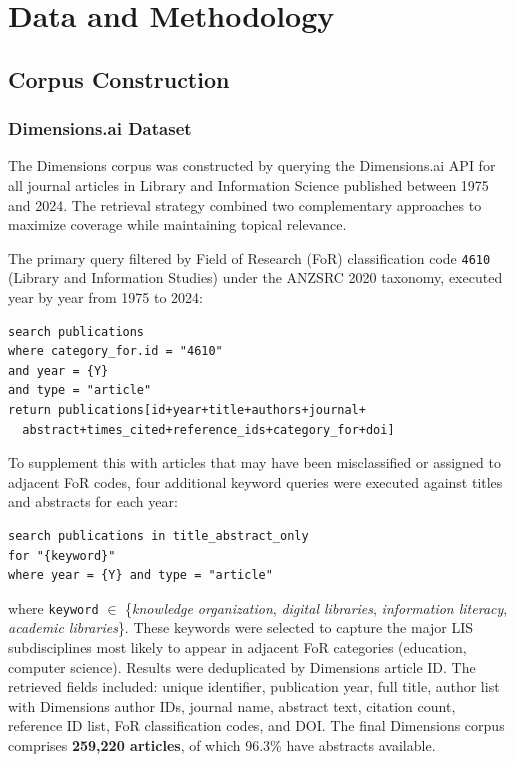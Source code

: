 \documentclass[12pt,a4paper]{article}
\begin{document}
\section{Data and Methodology}
\label{sec:data}

\subsection{Corpus Construction}

\subsubsection{Dimensions.ai Dataset}

The Dimensions corpus was constructed by querying the Dimensions.ai API for all
journal articles in Library and Information Science published between 1975 and
2024. The retrieval strategy combined two complementary approaches to maximize
coverage while maintaining topical relevance.

The primary query filtered by Field of Research (FoR) classification code
\texttt{4610} (Library and Information Studies) under the ANZSRC 2020 taxonomy,
executed year by year from 1975 to 2024:

\begin{verbatim}
search publications
where category_for.id = "4610"
and year = {Y}
and type = "article"
return publications[id+year+title+authors+journal+
  abstract+times_cited+reference_ids+category_for+doi]
\end{verbatim}

To supplement this with articles that may have been misclassified or assigned to
adjacent FoR codes, four additional keyword queries were executed against titles
and abstracts for each year:

\begin{verbatim}
search publications in title_abstract_only
for "{keyword}"
where year = {Y} and type = "article"
\end{verbatim}

\noindent where \texttt{keyword} $\in$ \{\textit{knowledge organization},
\textit{digital libraries}, \textit{information literacy},
\textit{academic libraries}\}. These keywords were selected to capture the major
LIS subdisciplines most likely to appear in adjacent FoR categories (education,
computer science). Results were deduplicated by Dimensions article ID. The
retrieved fields included: unique identifier, publication year, full title, author
list with Dimensions author IDs, journal name, abstract text, citation count,
reference ID list, FoR classification codes, and DOI. The final Dimensions corpus
comprises \textbf{259,220 articles}, of which 96.3\% have abstracts available.
\end{document}
